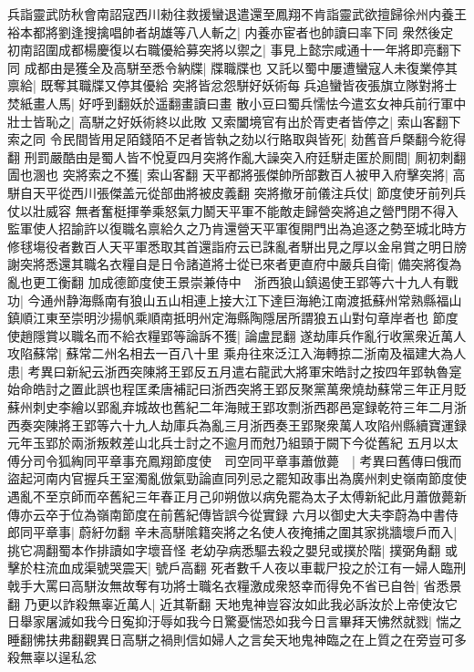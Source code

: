 兵詣靈武防秋會南詔寇西川勑往救援蠻退遣還至鳳翔不肯詣靈武欲擅歸徐州内養王裕本都將劉逢搜擒唱帥者胡雄等八人斬之|{
	内養亦宦者也帥讀曰率下同}
衆然後定　初南詔圍成都楊慶復以右職優給募突將以禦之|{
	事見上懿宗咸通十一年將即亮翻下同}
成都由是獲全及高駢至悉令納牒|{
	牒職牒也}
又託以蜀中屢遭蠻寇人未復業停其禀給|{
	既奪其職牒又停其優給}
突將皆忿怨駢好妖術每兵追蠻皆夜張旗立隊對將士焚紙畫人馬|{
	好呼到翻妖於遥翻畫讀曰畫}
散小豆曰蜀兵懦怯今遣玄女神兵前行軍中壯士皆恥之|{
	高駢之好妖術終以此敗}
又索闔境官有出於胥吏者皆停之|{
	索山客翻下索之同}
令民間皆用足陌錢陌不足者皆執之劾以行賂取與皆死|{
	劾舊音戶槩翻今紇得翻}
刑罰嚴酷由是蜀人皆不悅夏四月突將作亂大譟突入府廷駢走匿於厠間|{
	厠初刺翻圊也溷也}
突將索之不獲|{
	索山客翻}
天平都將張傑帥所部數百人被甲入府擊突將|{
	高駢自天平從西川張傑盖元從部曲將被皮義翻}
突將撤牙前儀注兵仗|{
	節度使牙前列兵仗以壯威容}
無者奮梃揮拳乘怒氣力鬭天平軍不能敵走歸營突將追之營門閉不得入監軍使人招諭許以復職名禀給久之乃肯還營天平軍復開門出為追逐之勢至城北時方修毬塲役者數百人天平軍悉取其首還詣府云已誅亂者駢出見之厚以金帛賞之明日牓謝突將悉還其職名衣糧自是日令諸道將士從已來者更直府中嚴兵自衛|{
	備突將復為亂也更工衡翻}
加成德節度使王景崇兼侍中　浙西狼山鎮遏使王郢等六十九人有戰功|{
	今通州静海縣南有狼山五山相連上接大江下達巨海絶江南渡抵蘇州常熟縣福山鎮順江東至崇明沙揚帆乘順南抵明州定海縣陶隱居所謂狼五山對句章岸者也}
節度使趙隱賞以職名而不給衣糧郢等論訴不獲|{
	論盧昆翻}
遂劫庫兵作亂行收黨衆近萬人攻陷蘇常|{
	蘇常二州名相去一百八十里}
乘舟往來泛江入海轉掠二浙南及福建大為人患|{
	考異曰新紀云浙西突陳將王郢反五月遣右龍武大將軍宋皓討之按四年郢執魯寔始命皓討之置此誤也程匡柔唐補記曰浙西突將王郢反聚黨萬衆燒劫蘇常三年正月貶蘇州刺史李繪以郢亂弃城故也舊紀二年海賊王郢攻剽浙西郡邑寔録乾符三年二月浙西奏突陳將王郢等六十九人劫庫兵為亂三月浙西奏王郢聚衆萬人攻陷州縣續寶運録元年玉郢於兩浙叛敕差山北兵士討之不逾月而尅乃組頸于闕下今從舊紀}
五月以太傅分司令狐綯同平章事充鳳翔節度使　司空同平章事蕭倣薨　|{
	考異曰舊傳曰俄而盜起河南内官握兵王室濁亂倣氣勁論直同列忌之罷知政事出為廣州刺史嶺南節度使遇亂不至京師而卒舊紀三年春正月己卯朔倣以病免罷為太子太傅新紀此月蕭倣薨新傳亦云卒于位為嶺南節度在前舊紀傳皆誤今從實録}
六月以御史大夫李蔚為中書侍郎同平章事|{
	蔚紆勿翻}
辛未高駢隂籍突將之名使人夜掩捕之圍其家挑牆壞戶而入|{
	挑它凋翻蜀本作排讀如字壞音怪}
老幼孕病悉驅去殺之嬰兒或撲於階|{
	撲弼角翻}
或擊於柱流血成渠號哭震天|{
	號戶高翻}
死者數千人夜以車載尸投之於江有一婦人臨刑戟手大罵曰高駢汝無故奪有功將士職名衣糧激成衆怒幸而得免不省已自咎|{
	省悉景翻}
乃更以詐殺無辜近萬人|{
	近其靳翻}
天地鬼神豈容汝如此我必訴汝於上帝使汝它日舉家屠滅如我今日寃抑汙辱如我今日驚憂惴恐如我今日言畢拜天怫然就戮|{
	惴之睡翻怫扶弗翻觀異日高駢之禍則信如婦人之言矣天地鬼神臨之在上質之在旁豈可多殺無辜以逞私忿}
